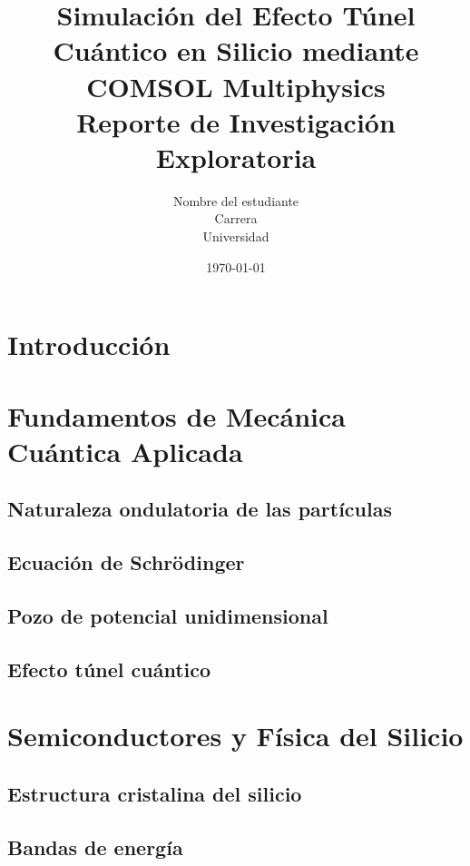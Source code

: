 \documentclass[12pt]{article}
\title{%
Simulación del Efecto Túnel Cuántico en Silicio mediante COMSOL Multiphysics\\
\large Reporte de Investigación Exploratoria
}
\author{%
Nombre del estudiante\\
Carrera\\
Universidad
}
\date{\today}
\begin{document}
\maketitle
\thispagestyle{empty}
\newpage

\begin{abstract}
\end{abstract}

\newpage
\tableofcontents
\newpage

\section{Introducción}

\section{Fundamentos de Mecánica Cuántica Aplicada}
\subsection{Naturaleza ondulatoria de las partículas}
\subsection{Ecuación de Schrödinger}
\subsection{Pozo de potencial unidimensional}
\subsection{Efecto túnel cuántico}

\section{Semiconductores y Física del Silicio}
\subsection{Estructura cristalina del silicio}
\subsection{Bandas de energía}
\end{document}
